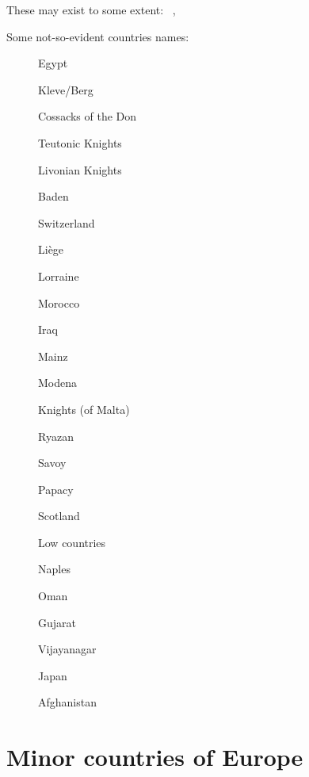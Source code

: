  These may exist to some extent:
%
{\theminorreligionshort{\loopitem}~\pays{\loopitem}}{, }

\aparag Some not-so-evident countries names:

\begin{multicols}{3}
  \begin{description}
  \item[\paysegypte] Egypt
  \item[\paysberg] Kleve/Berg
  \item[\payscosaquesdon] Cossacks of the Don
  \item[] Teutonic Knights
  \item[] Livonian Knights
  \item[\paysbade] Baden
  \item[\payssuisse] Switzerland
  \item[\paysliege] Liège
  \item[\payslorraine] Lorraine
  \item[\paysmaroc] Morocco
  \item[\paysirak] Iraq
  \item[\paysmayence] Mainz
  \item[\paysmodene] Modena
  \item[\payschevaliers] Knights (of Malta)
  \item[\paysryazan] Ryazan
  \item[\payssavoie] Savoy
  \item[\payspapaute] Papacy
  \item[\paysecosse] Scotland
  \item[\paysprovincesne] Low countries
  \item[\paysnaples] Naples
  \item[\paysoman] Oman
  \item[\paysgujarat] Gujarat
  \item[\paysvijayanagar] Vijayanagar
  \item[\paysjapon] Japan
  \item[\paysafghans] Afghanistan
  \end{description}
\end{multicols}
\vfill




\section{Minor countries of Europe}


